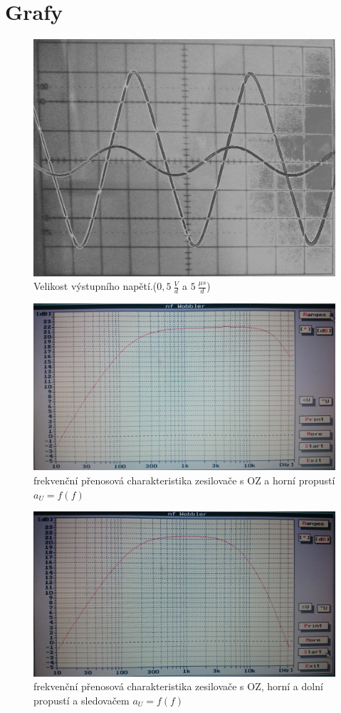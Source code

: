 \section*{Grafy}
\setcounter{figure}{0}
\renewcommand{\figurename}{Graf č.}
  
  \begin{figure}[H]
    \centering
    \includegraphics[width=14cm]{../img/g1.png}
    \caption{Velikost výstupního napětí.($0,5~\frac{V}{d}$ a $5~\frac{\mu s}{d}$) }
    \label{gra:1}
  \end{figure}
  
  \begin{figure}[H]
    \centering
    \includegraphics[width=16cm]{../img/g2.png}
    \caption{frekvenční přenosová charakteristika zesilovače s OZ a horní propustí $a_U = f(f)$}
    \label{gra:1}
  \end{figure}
  
  \begin{figure}[H]
    \centering
    \includegraphics[width=16cm]{../img/g3.png}
    \caption{frekvenční přenosová charakteristika zesilovače s OZ, horní a dolní propustí a sledovačem $a_U = f(f)$}
    \label{gra:1}
  \end{figure}    

 
